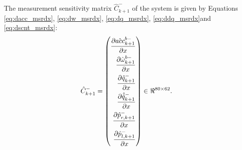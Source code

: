 The measurement sensitivity matrix $\hat{C}_{k+1}^-$ of the system is given by Equations \ref{eq:dacc_msrdx}, \ref{eq:dw_msrdx}, \ref{eq:dq_msrdx}, \ref{eq:ddq_msrdx}and \ref{eq:dscnt_msrdx}:
\begin{equation}
    \label{eq:msr_mat}
    \hat{C}^-_{k+1} = \left(
   \begin{aligned}
   \frac{\partial {\hat{acc}_{k+1}^{b-}}}{\partial {x}} \\
   \frac{\partial {\hat{\omega}^{b-}_{k+1}}}{\partial {x}} \\
    \frac{\partial {\hat{q}_{k+1}^-}}{\partial {x}} \\
    \frac{\partial {\hat{\dot{q}}_{k+1}^-}}{\partial {x}} \\
    \frac{\partial {\hat{p}_{r,k+1}^-}}{\partial {x}} \\
    \frac{\partial {\hat{p}_{l,k+1}^-}}{\partial {x}} \\
   \end{aligned}
	 \right) \in \Re^{80 \times 62}.
\end{equation}

%
